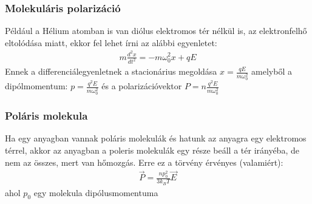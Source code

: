 \documentclass{article}
\begin{document}
\subsubsection{Molekuláris polarizáció}
Például a Hélium atomban is van diólus elektromos tér nélkül is, az elektronfelhő eltolódása miatt, ekkor fel lehet írni az alábbi egyenletet:
\begin{gather*}
m \frac{d^2 x}{dt^2} = -m\omega_0^2 x + qE
\end{gather*}
Ennek a differenciálegyenletnek a stacionárius megoldása $x=\frac{qE}{m\omega_0^2}$ amelyből a dipólmomentum: $p=\frac{q^2E}{m\omega_0^2}$ és a polarizációvektor $P=n \frac{q^2E}{m\omega_0^2}$
\subsubsection{Poláris molekula}
Ha egy anyagban vannak poláris molekulák és hatunk az anyagra egy elektromos térrel, akkor az anyagban a poleris molekulák egy része beáll a tér irányéba, de nem az összes, mert van hőmozgás. Erre ez a törvény érvényes (valamiért):
\begin{gather*}
\vec{P} = \frac{np_0^2}{3k_{B} T} \vec{E}
\end{gather*}
ahol $p_0$ egy molekula dipólusmomentuma
\end{document}
